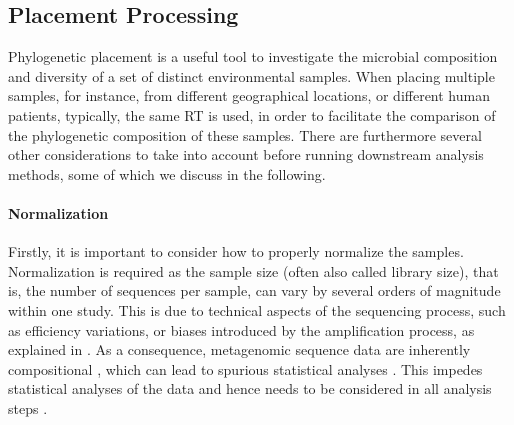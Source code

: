 

\subsection{Placement Processing}
\label{ch:Foundations:sec:PhylogeneticPlacement:sub:PlacementProcessing}

Phylogenetic placement is a useful tool to investigate the microbial composition and diversity
of a set of distinct environmental samples.
When placing multiple samples, for instance, from different geographical locations, or different human patients,
typically, the same \ac{RT} is used, in order to facilitate the comparison of the phylogenetic composition of these samples.
There are furthermore several other considerations to take into account before running downstream analysis methods,
some of which we discuss in the following.

\paragraph{Normalization}
\label{ch:Foundations:sec:PhylogeneticPlacement:sub:PlacementProcessing:par:Normalization}

Firstly, it is important to consider how to properly normalize the samples.
Normalization is required as the sample size (often also called library size),
that is, the number of sequences per sample, can vary by several orders of magnitude within one study.
This is due to technical aspects of the sequencing process, such as efficiency variations,
or biases introduced by the amplification process,
as explained in .
As a consequence, metagenomic sequence data are inherently compositional \cite{Li2015a,Gloor2017,Quinn2018},
which can lead to spurious statistical analyses \cite{Aitchison1986,Jackson1997,Tsilimigras2016,Gloor2016a}.
This impedes statistical analyses of the data
and hence needs to be considered in all analysis steps \cite{Li2015a,Silverman2017,Quinn2018}.

